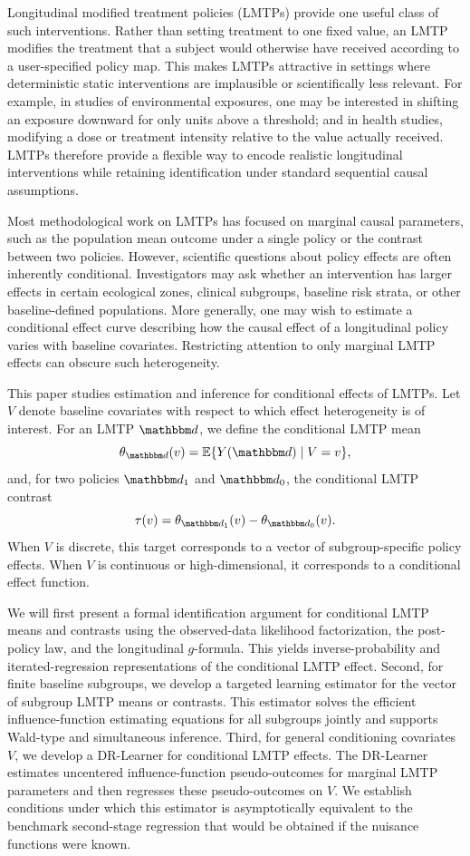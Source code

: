 \documentclass[11pt]{article}
\begin{document}
Longitudinal modified treatment policies (LMTPs) provide one useful
class of such interventions. Rather than setting treatment to one fixed value, 
an LMTP modifies the treatment that a subject would otherwise have received according
to a user-specified policy map. This makes LMTPs attractive in settings where
deterministic static interventions are implausible or scientifically less relevant. For example,
in studies of environmental exposures, one may be interested in shifting an exposure 
downward for only units above a threshold; and in health studies, modifying a
dose or treatment intensity relative to the value actually received. LMTPs therefore
provide a flexible way to encode realistic longitudinal interventions while retaining
identification under standard sequential causal assumptions. 

Most methodological work on LMTPs has focused on marginal causal parameters,
such as the population mean outcome under a single policy or the 
contrast between two policies. However, scientific questions about policy effects are often
inherently conditional. Investigators may ask whether an intervention has 
larger effects in certain ecological zones, clinical subgroups, baseline risk strata,
or other baseline-defined populations. More generally, one may wish
to estimate a conditional effect curve describing how the causal effect of a longitudinal 
policy varies with baseline covariates.  Restricting attention to only marginal 
LMTP effects can obscure such heterogeneity. 

This paper studies estimation and inference for conditional effects of LMTPs. 
Let $V$ denote baseline covariates with respect to which 
effect heterogeneity is of interest. For an LMTP $\mathbbm d$, we define the conditional 
LMTP mean 
\[ 
\theta_{\mathbbm d}(v) =   \mathbb{E}\{Y(\mathbbm d) \mid V=v\},
\]
and, for two policies \(\mathbbm d_1\) and \(\mathbbm d_0\), the conditional LMTP
contrast
\[
  \tau(v)
  =
  \theta_{\mathbbm d_1}(v) - \theta_{\mathbbm d_0}(v).
\]
When $V$ is discrete, this target corresponds to a vector of subgroup-specific
policy effects. When $V$ is continuous or high-dimensional, it corresponds to a
conditional effect function. 

We will first present a formal identification
argument for conditional LMTP means and contrasts using the observed-data
likelihood factorization, the post-policy law, and the longitudinal
\(g\)-formula. This yields inverse-probability and iterated-regression
representations of the conditional LMTP effect. Second, for finite baseline
subgroups, we develop a targeted learning estimator for the vector of subgroup
LMTP means or contrasts. This estimator solves the efficient influence-function
estimating equations for all subgroups jointly and supports Wald-type and
simultaneous inference. Third, for general conditioning covariates \(V\), we
develop a DR-Learner for conditional LMTP effects. The DR-Learner estimates
uncentered influence-function pseudo-outcomes for marginal LMTP parameters and
then regresses these pseudo-outcomes on \(V\). We establish conditions under
which this estimator is asymptotically equivalent to the benchmark second-stage
regression that would be obtained if the nuisance functions were known.
\end{document}
